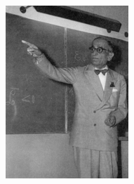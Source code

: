 \documentclass[aspectratio=169,xcolor=dvipsnames,11pt]{beamer}
\begin{document}
\begin{frame}
\begin{minipage}{0.3\linewidth}
\begin{figure}
{\begin{minipage}[b]{0.45\textwidth}
    \includegraphics[width=\linewidth]{figures/Antonio_Signorini.jpg}
  \end{minipage}}%
  \hfill
  \begin{minipage}[b]{0.46\textwidth}

\end{minipage}
\end{figure}
\end{minipage}
\end{frame}
\end{document}
